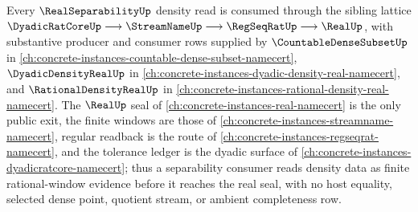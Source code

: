 Every $\RealSeparabilityUp$ density read is consumed through the sibling lattice $\DyadicRatCoreUp \longrightarrow \StreamNameUp \longrightarrow \RegSeqRatUp \longrightarrow \RealUp$, with substantive producer and consumer rows supplied by $\CountableDenseSubsetUp$ in \autoref{ch:concrete-instances-countable-dense-subset-namecert}, $\DyadicDensityRealUp$ in \autoref{ch:concrete-instances-dyadic-density-real-namecert}, and $\RationalDensityRealUp$ in \autoref{ch:concrete-instances-rational-density-real-namecert}.
The $\RealUp$ seal of \autoref{ch:concrete-instances-real-namecert} is the only public exit, the finite windows are those of \autoref{ch:concrete-instances-streamname-namecert}, regular readback is the route of \autoref{ch:concrete-instances-regseqrat-namecert}, and the tolerance ledger is the dyadic surface of \autoref{ch:concrete-instances-dyadicratcore-namecert}; thus a separability consumer reads density data as finite rational-window evidence before it reaches the real seal, with no host equality, selected dense point, quotient stream, or ambient completeness row.
